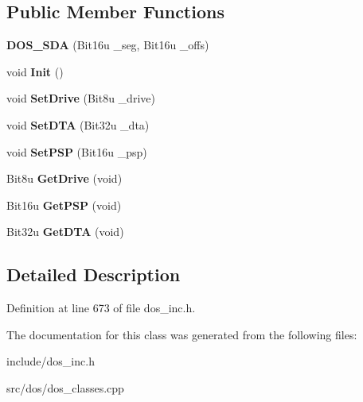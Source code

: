 \subsection*{Public Member Functions}
\begin{DoxyCompactItemize}
\item 
\hypertarget{classDOS__SDA_a6d3cdb7092bcf54e478ccf3f47ba5d5f}{{\bfseries D\-O\-S\-\_\-\-S\-D\-A} (Bit16u \-\_\-seg, Bit16u \-\_\-offs)}\label{classDOS__SDA_a6d3cdb7092bcf54e478ccf3f47ba5d5f}

\item 
\hypertarget{classDOS__SDA_ac7714f909bc845b995adc9d83a336dc7}{void {\bfseries Init} ()}\label{classDOS__SDA_ac7714f909bc845b995adc9d83a336dc7}

\item 
\hypertarget{classDOS__SDA_a26e7bcf4f9d9624cb400868ba2c92042}{void {\bfseries Set\-Drive} (Bit8u \-\_\-drive)}\label{classDOS__SDA_a26e7bcf4f9d9624cb400868ba2c92042}

\item 
\hypertarget{classDOS__SDA_a97cc9bf22c2fd0b3dfcdf9e7ed941b90}{void {\bfseries Set\-D\-T\-A} (Bit32u \-\_\-dta)}\label{classDOS__SDA_a97cc9bf22c2fd0b3dfcdf9e7ed941b90}

\item 
\hypertarget{classDOS__SDA_a01a00b99627b18c1b53112911554fb40}{void {\bfseries Set\-P\-S\-P} (Bit16u \-\_\-psp)}\label{classDOS__SDA_a01a00b99627b18c1b53112911554fb40}

\item 
\hypertarget{classDOS__SDA_a6191cfbb11aa6071c6900e3a42d3d4e8}{Bit8u {\bfseries Get\-Drive} (void)}\label{classDOS__SDA_a6191cfbb11aa6071c6900e3a42d3d4e8}

\item 
\hypertarget{classDOS__SDA_a7a777fd33ac1dcf09aeaa1e94e53eec5}{Bit16u {\bfseries Get\-P\-S\-P} (void)}\label{classDOS__SDA_a7a777fd33ac1dcf09aeaa1e94e53eec5}

\item 
\hypertarget{classDOS__SDA_a4a0b598523ac18da40e069ff37f43fe4}{Bit32u {\bfseries Get\-D\-T\-A} (void)}\label{classDOS__SDA_a4a0b598523ac18da40e069ff37f43fe4}

\end{DoxyCompactItemize}


\subsection{Detailed Description}


Definition at line 673 of file dos\-\_\-inc.\-h.



The documentation for this class was generated from the following files\-:\begin{DoxyCompactItemize}
\item 
include/dos\-\_\-inc.\-h\item 
src/dos/dos\-\_\-classes.\-cpp\end{DoxyCompactItemize}
